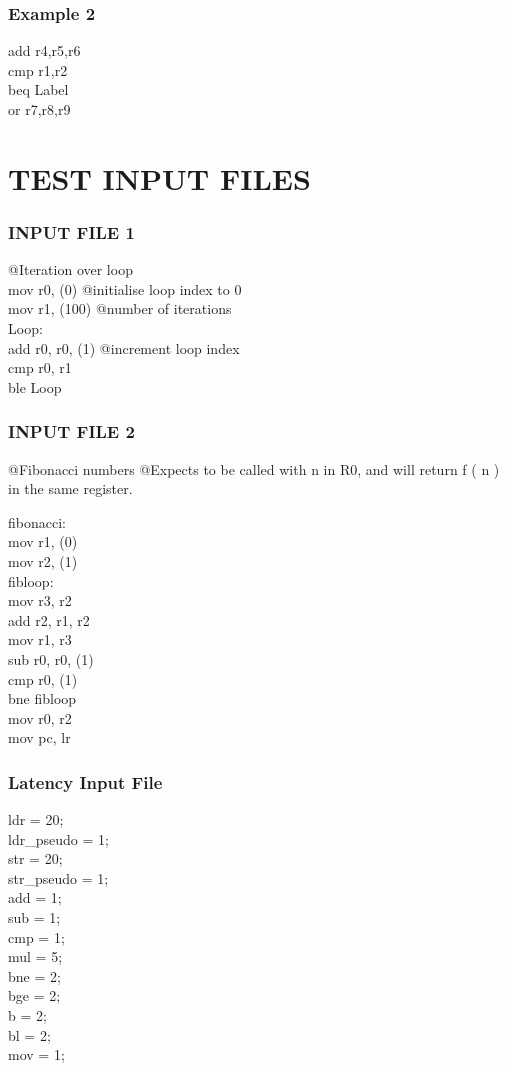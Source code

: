 \documentclass{scrreprt}
\begin{document}
\subsection{Example 2}
add r4,r5,r6\\
cmp r1,r2\\
beq Label\\
or  r7,r8,r9\\

\chapter{TEST INPUT FILES}
\subsection{INPUT FILE 1}
@Iteration over loop\\
mov r0, (0)  @initialise loop index to 0\\
mov r1, (100) @number of iterations\\

Loop:\\
add r0, r0, (1)  @increment loop index\\
cmp r0, r1\\
ble Loop\\
\subsection{INPUT FILE 2}
@Fibonacci numbers
@Expects to be called with n in R0, and will return f ( n ) in the same register.

fibonacci:\\
        mov   r1,  (0)\\
        mov   r2,  (1)\\
 
fibloop:\\
        mov   r3,  r2\\
        add   r2,  r1,  r2\\
        mov   r1,  r3\\
        sub   r0,  r0,  (1)\\
        cmp   r0,  (1)\\
        bne   fibloop\\
 
        mov   r0,  r2\\
        mov   pc,  lr\\
\subsection{Latency Input File}
ldr = 20;\\
ldr_pseudo = 1;\\ 
str = 20;\\
str_pseudo = 1;\\
add = 1;\\
sub = 1;\\
cmp = 1;\\
mul = 5;\\
bne = 2;\\
bge = 2;\\
b = 2;\\
bl = 2;\\
mov = 1;\\
\end{document}
